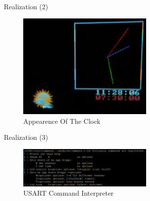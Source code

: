 \documentclass[apectratio=169]{beamer}
\begin{document}
	\begin{frame}{Realization (2)}
	\begin{figure}
        	\centering
                \includegraphics[width=0.6\textwidth]{./fig/clock_weather}
                \caption{Appearence Of The Clock}
        \end{figure}
	\end{frame}
	
	\begin{frame}{Realization (3)}
	\begin{figure}
        	\centering
                \includegraphics[width=0.6\textwidth]{./fig/command_usage}
                \caption{USART Command Interpreter}
        \end{figure}


	\end{frame}
 
\end{document}
